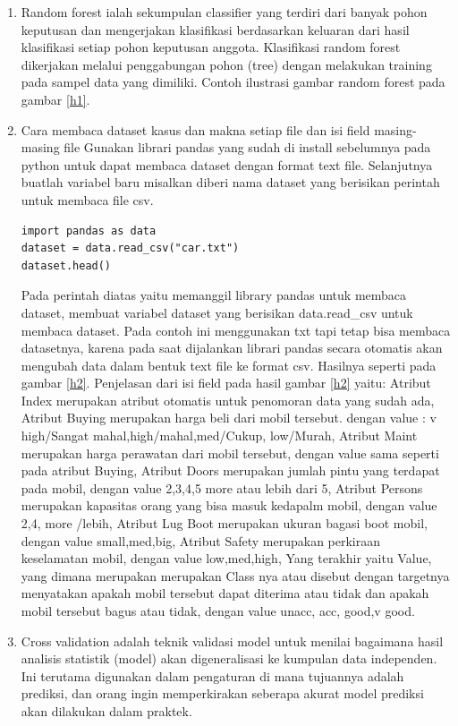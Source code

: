 \begin{enumerate}
\item Random forest ialah sekumpulan classifier yang terdiri dari banyak pohon keputusan dan mengerjakan klasifikasi berdasarkan keluaran dari hasil klasifikasi setiap pohon keputusan anggota. Klasifikasi random forest dikerjakan melalui penggabungan pohon (tree) dengan melakukan training pada sampel data yang dimiliki. Contoh ilustrasi gambar random forest pada gambar \ref{h1}.
\item Cara membaca dataset kasus dan makna setiap file dan isi field masing-masing file
\subitem Gunakan librari pandas yang sudah di install sebelumnya pada python untuk dapat membaca dataset dengan format text file.
\subitem  Selanjutnya buatlah variabel baru misalkan diberi nama dataset yang berisikan perintah untuk membaca file csv.
\begin{verbatim}
import pandas as data
dataset = data.read_csv("car.txt")
dataset.head()
\end{verbatim}
\subitem Pada perintah diatas yaitu memanggil library pandas untuk membaca dataset, membuat variabel dataset yang berisikan data.read\_csv untuk membaca dataset. Pada contoh ini menggunakan txt tapi tetap bisa membaca datasetnya, karena pada saat dijalankan librari pandas secara otomatis akan mengubah data dalam bentuk text file ke format csv. Hasilnya seperti pada gambar \ref{h2}.
\subitem Penjelasan dari isi field pada hasil gambar \ref{h2} yaitu: Atribut Index merupakan atribut otomatis untuk penomoran data yang sudah ada, Atribut Buying merupakan harga beli dari mobil tersebut. dengan value : v high/Sangat mahal,high/mahal,med/Cukup, low/Murah, Atribut Maint merupakan harga perawatan dari mobil tersebut, dengan value sama seperti pada atribut Buying, Atribut Doors merupakan jumlah pintu yang terdapat pada mobil, dengan value 2,3,4,5 more atau lebih dari 5, Atribut Persons merupakan kapasitas orang yang bisa masuk kedapalm mobil, dengan value 2,4, more /lebih, Atribut Lug Boot merupakan ukuran bagasi boot mobil, dengan value small,med,big, Atribut Safety merupakan perkiraan keselamatan mobil, dengan value low,med,high, Yang terakhir yaitu Value, yang dimana merupakan merupakan Class nya atau disebut dengan targetnya menyatakan apakah mobil tersebut dapat diterima atau tidak dan apakah mobil tersebut bagus atau tidak, dengan value unacc, acc, good,v good.
\item Cross validation adalah teknik validasi model untuk menilai bagaimana hasil analisis statistik (model) akan digeneralisasi ke kumpulan data independen. Ini terutama digunakan dalam pengaturan di mana tujuannya adalah prediksi, dan orang ingin memperkirakan seberapa akurat model prediksi akan dilakukan dalam praktek.

\end{enumerate}

